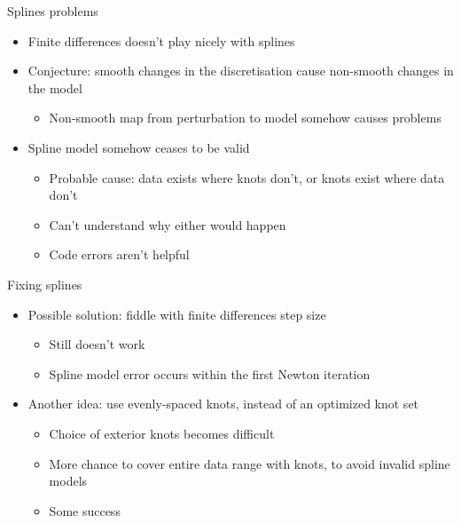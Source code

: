 \documentclass[presentation]{beamer}
\begin{document}
\begin{frame}[<+->][label={sec:org07faadf}]{Splines problems}
\begin{itemize}
\item Finite differences doesn't play nicely with splines
\item Conjecture: smooth changes in the discretisation cause non-smooth changes in the model
\begin{itemize}
\item Non-smooth map from perturbation to model somehow causes problems
\end{itemize}
\end{itemize}
\vfill
\begin{itemize}
\item Spline model somehow ceases to be valid
\begin{itemize}
\item Probable cause: data exists where knots don't, or knots exist where data don't
\item Can't understand why either would happen
\item Code errors aren't helpful
\end{itemize}
\end{itemize}
\end{frame}

\begin{frame}[<+->][label={sec:orge569ccf}]{Fixing splines}
\begin{itemize}
\item Possible solution: fiddle with finite differences step size
\begin{itemize}
\item Still doesn't work
\item Spline model error occurs within the first Newton iteration
\end{itemize}
\end{itemize}
\vfill
\begin{itemize}
\item Another idea: use evenly-spaced knots, instead of an optimized knot set
\begin{itemize}
\item Choice of exterior knots becomes difficult
\item More chance to cover entire data range with knots, to avoid invalid spline models
\item Some success
\end{itemize}
\end{itemize}
\end{frame}
\end{document}

